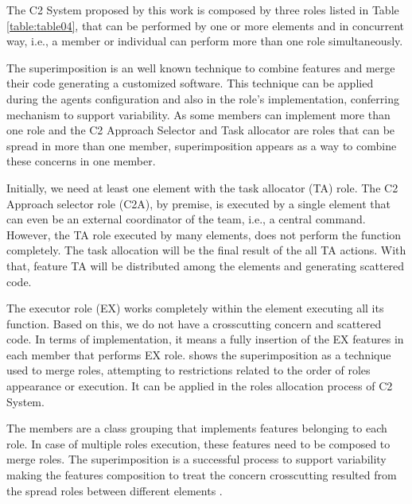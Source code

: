 The C2 System proposed by this work is composed by three roles listed in Table \ref{table:table04}, that can be performed by one or more elements and in concurrent way, i.e., a member or individual can perform more than one role simultaneously.



The superimposition is an well known technique to combine features and merge their code generating a customized software\cite{apel100}. This technique can be applied during the agents configuration and also in the role's implementation, conferring mechanism to support variability. As some members can implement more than one role and the C2 Approach Selector and Task allocator are roles that can be spread in more than one member, superimposition appears as a way to combine these concerns in one member.

Initially, we need at least one element with the task allocator (TA) role. The C2 Approach selector role (C2A), by premise, is executed by a single element that can even be an external coordinator of the team, i.e., a central command. However, the TA role executed by many elements, does not perform the function completely. The task allocation will be the final result of the all TA actions. With that, feature TA will be distributed among the elements and generating scattered code.

The executor role (EX) works completely within the element executing all its function. Based on this, we do not have a crosscutting concern and scattered code. In terms of implementation, it means a fully insertion of the EX features in each member that performs EX role. \cite{apel100} shows the superimposition as a technique used to merge roles, attempting to restrictions related to the order of roles appearance or execution. It can be applied in the roles allocation process of C2 System.

The members are a class grouping that implements features belonging to each role. In case of multiple roles execution, these features need to be composed to merge roles. The superimposition is a successful process to support variability making the features composition to treat the concern crosscutting resulted from the spread roles between different elements \cite{apel2011, marin2005}.

